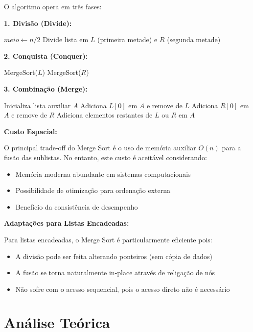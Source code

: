 \documentclass[conference]{IEEEtran}
\begin{document}
O algoritmo opera em três fases:

\textbf{1. Divisão (Divide):}
\begin{algorithmic}
    \RETURN
\ENDIF
\STATE $meio \gets n / 2$
\STATE Divide lista em $L$ (primeira metade) e $R$ (segunda metade)
\end{algorithmic}

\textbf{2. Conquista (Conquer):}
\begin{algorithmic}
\STATE MergeSort($L$)
\STATE MergeSort($R$)
\end{algorithmic}

\textbf{3. Combinação (Merge):}
\begin{algorithmic}
\STATE Inicializa lista auxiliar $A$
        \STATE Adiciona $L[0]$ em $A$ e remove de $L$
    \ELSE
        \STATE Adiciona $R[0]$ em $A$ e remove de $R$
    \ENDIF
\ENDWHILE
\STATE Adiciona elementos restantes de $L$ ou $R$ em $A$
\end{algorithmic}

\textbf{Custo Espacial:}

O principal trade-off do Merge Sort é o uso de memória auxiliar $O(n)$ para a fusão das sublistas. No entanto, este custo é aceitável considerando:
\begin{itemize}
    \item Memória moderna abundante em sistemas computacionais
    \item Possibilidade de otimização para ordenação externa
    \item Benefício da consistência de desempenho
\end{itemize}

\textbf{Adaptações para Listas Encadeadas:}

Para listas encadeadas, o Merge Sort é particularmente eficiente pois:
\begin{itemize}
    \item A divisão pode ser feita alterando ponteiros (sem cópia de dados)
    \item A fusão se torna naturalmente in-place através de religação de nós
    \item Não sofre com o acesso sequencial, pois o acesso direto não é necessário
\end{itemize}

\section{Análise Teórica}
\end{document}
